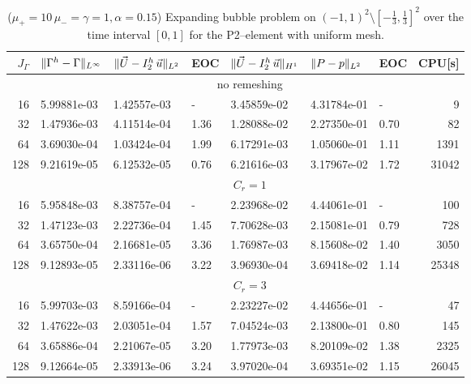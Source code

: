 \begin{table}
\center
\hspace*{-3.25cm}
\begin{tabular}{rllllllr}
\hline
$J_\Gamma$ & $\|\Gamma^h - \Gamma\|_{L^\infty}$ & $\|\vec U - I^h_{2}\,\vec u\|_{L^2}$ & EOC & $\|\vec U - I^h_{2}\,\vec u\|_{H^1}$ & $\|P - p\|_{L^2}$ & EOC
& CPU[s] \\
\hline
& \multicolumn{7}{c}{no remeshing} \\
\hline
 16 & 5.99881e-03 & 1.42557e-03 &    - & 3.45859e-02 & 4.31784e-01 &    - &
9 \\
 32 & 1.47936e-03 & 4.11514e-04 & 1.36 & 1.28088e-02 & 2.27350e-01 & 0.70 &
82 \\
 64 & 3.69030e-04 & 1.03424e-04 & 1.99 & 6.17291e-03 & 1.05060e-01 & 1.11 &
1391 \\
128 & 9.21619e-05 & 6.12532e-05 & 0.76 & 6.21616e-03 & 3.17967e-02 & 1.72 &
31042 \\
\hline
& \multicolumn{7}{c}{$C_r=1$} \\
\hline
 16 & 5.95848e-03 & 8.38757e-04 &    - & 2.23968e-02 & 4.44061e-01 &    - &
100 \\
 32 & 1.47123e-03 & 2.22736e-04 & 1.45 & 7.70628e-03 & 2.15081e-01 & 0.79 &
728 \\
 64 & 3.65750e-04 & 2.16681e-05 & 3.36 & 1.76987e-03 & 8.15608e-02 & 1.40 &
3050 \\
128 & 9.12893e-05 & 2.33116e-06 & 3.22 & 3.96930e-04 & 3.69418e-02 & 1.14 &
25348 \\
\hline
& \multicolumn{7}{c}{$C_r=3$} \\
\hline
 16 & 5.99703e-03 & 8.59166e-04 &    - & 2.23227e-02 & 4.44656e-01 &    - &
47 \\
 32 & 1.47622e-03 & 2.03051e-04 & 1.57 & 7.04524e-03 & 2.13800e-01 & 0.80 &
145 \\
 64 & 3.65886e-04 & 2.21067e-05 & 3.20 & 1.77973e-03 & 8.20109e-02 & 1.38 &
2325 \\
128 & 9.12664e-05 & 2.33913e-06 & 3.24 & 3.97020e-04 & 3.69351e-02 & 1.15 &
26045 \\
\hline
\end{tabular}
\hspace*{-3.25cm}
\caption[Stokes expanding bubble uniform mesh errors P2--\pdg]
{($\mu_+ = 10\,\mu_- = \gamma = 1,\alpha = 0.15$) Expanding bubble
problem on $(-1,1)^2\setminus[-\frac{1}{3},\frac{1}{3}]^2$ over the time
interval $[0,1]$ for the P2--\pdg element with uniform mesh.}
\label{tab:expandingbubble2Dp2p1dg}
\end{table}
